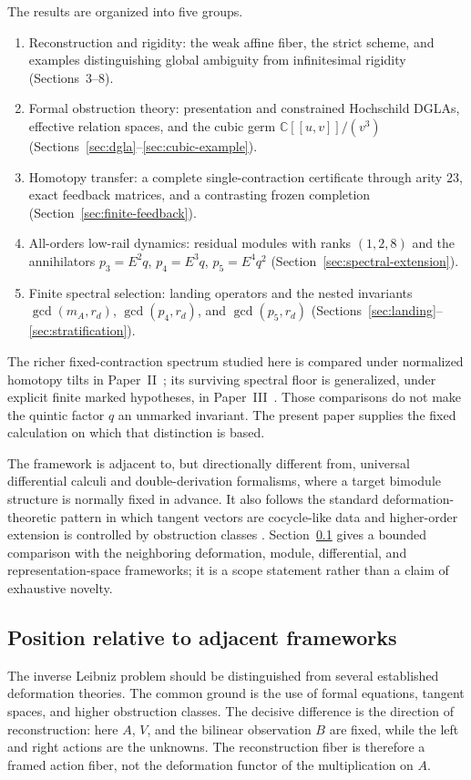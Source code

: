 \documentclass[11pt]{amsart}
\newcommand{\C}{\mathbb C}
\begin{document}
The results are organized into five groups.
\begin{enumerate}[label=(\roman*)]
\item Reconstruction and rigidity: the weak affine fiber, the strict scheme, and examples
distinguishing global ambiguity from infinitesimal rigidity (Sections~3--8).
\item Formal obstruction theory: presentation and constrained Hochschild DGLAs,
effective relation spaces, and the cubic germ $\C[[u,v]]/(v^3)$
(Sections~\ref{sec:dgla}--\ref{sec:cubic-example}).
\item Homotopy transfer: a complete single-contraction certificate through arity
$23$, exact feedback matrices, and a contrasting frozen completion
(Section~\ref{sec:finite-feedback}).
\item All-orders low-rail dynamics: residual modules with ranks $(1,2,8)$ and the
annihilators $p_3=E^2q$, $p_4=E^3q$, $p_5=E^4q^2$
(Section~\ref{sec:spectral-extension}).
\item Finite spectral selection: landing operators and the nested invariants
$\gcd(m_A,r_d)$, $\gcd(p_4,r_d)$, and $\gcd(p_5,r_d)$
(Sections~\ref{sec:landing}--\ref{sec:stratification}).
\end{enumerate}

The richer fixed-contraction spectrum studied here is compared under normalized homotopy
tilts in Paper~II~\cite{PaperII}; its surviving spectral floor is generalized, under explicit
finite marked hypotheses, in Paper~III~\cite{PaperIII}. Those comparisons do not make
the quintic factor $q$ an unmarked invariant. The present paper supplies the fixed
calculation on which that distinction is based.

The framework is adjacent to, but directionally different from, universal differential calculi and double-derivation formalisms, where a target bimodule structure is normally fixed in advance.  It also follows the standard deformation-theoretic pattern in which tangent vectors are cocycle-like data and higher-order extension is controlled by obstruction classes \cite{Gerstenhaber1964,Schlessinger1968}.  Section~\ref{sec:literature-position} gives a bounded comparison with the neighboring deformation, module, differential, and representation-space frameworks; it is a scope statement rather than a claim of exhaustive novelty.

\subsection{Position relative to adjacent frameworks}\label{sec:literature-position}
The inverse Leibniz problem should be distinguished from several established deformation theories.  The common ground is the use of formal equations, tangent spaces, and higher obstruction classes.  The decisive difference is the direction of reconstruction: here $A$, $V$, and the bilinear observation $B$ are fixed, while the left and right actions are the unknowns.  The reconstruction fiber is therefore a framed action fiber, not the deformation functor of the multiplication on $A$.
\end{document}
